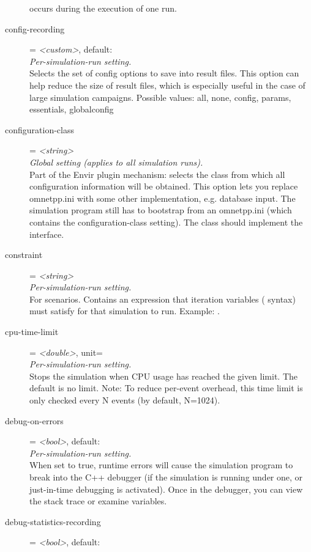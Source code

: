 \begin{description}
    occurs during the execution of one run.
\item[config-recording] = \textit{<custom>}, default: \\
    \textit{Per-simulation-run setting.}\\
    Selects the set of config options to save into result files. This option
    can help reduce the size of result files, which is especially useful in the
    case of large simulation campaigns. Possible values: all, none, config,
    params, essentials, globalconfig
\item[configuration-class] = \textit{<string>}\\
    \textit{Global setting (applies to all simulation runs).}\\
    Part of the Envir plugin mechanism: selects the class from which all
    configuration information will be obtained. This option lets you replace
    omnetpp.ini with some other implementation, e.g. database input. The
    simulation program still has to bootstrap from an omnetpp.ini (which
    contains the configuration-class setting). The class should implement the
     interface.
\item[constraint] = \textit{<string>}\\
    \textit{Per-simulation-run setting.}\\
    For scenarios. Contains an expression that iteration variables
    (\ttt{\$\{{\allowbreak}\}{\allowbreak}} syntax) must satisfy for that
    simulation to run. Example: .
\item[cpu-time-limit] = \textit{<double>}, unit=\\
    \textit{Per-simulation-run setting.}\\
    Stops the simulation when CPU usage has reached the given limit. The
    default is no limit. Note: To reduce per-event overhead, this time limit is
    only checked every N events (by default, N=1024).
\item[debug-on-errors] = \textit{<bool>}, default: \\
    \textit{Per-simulation-run setting.}\\
    When set to true, runtime errors will cause the simulation program to break
    into the C++ debugger (if the simulation is running under one, or
    just-in-time debugging is activated). Once in the debugger, you can view
    the stack trace or examine variables.
\item[debug-statistics-recording] = \textit{<bool>}, default: \\

\end{description}
